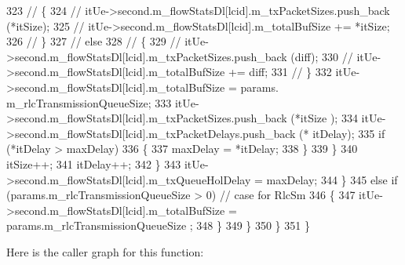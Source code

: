 \begin{DoxyCode}
323 \textcolor{comment}{//                                      \{}
324 \textcolor{comment}{//                                              itUe->second.m\_flowStatsDl[lcid].m\_txPacketSizes.push\_back
       (*itSize);}
325 \textcolor{comment}{//                                              itUe->second.m\_flowStatsDl[lcid].m\_totalBufSize += *itSize;}
326 \textcolor{comment}{//                                      \}}
327 \textcolor{comment}{//                                      else}
328 \textcolor{comment}{//                                      \{}
329 \textcolor{comment}{//                                              itUe->second.m\_flowStatsDl[lcid].m\_txPacketSizes.push\_back
       (diff);}
330 \textcolor{comment}{//                                              itUe->second.m\_flowStatsDl[lcid].m\_totalBufSize += diff;}
331 \textcolor{comment}{//                                      \}}
332                                         itUe->second.m\_flowStatsDl[lcid].m\_totalBufSize = params.
      m\_rlcTransmissionQueueSize;
333                                         itUe->second.m\_flowStatsDl[lcid].m\_txPacketSizes.push\_back (*itSize
      );
334                                         itUe->second.m\_flowStatsDl[lcid].m\_txPacketDelays.push\_back (*
      itDelay);
335                                         \textcolor{keywordflow}{if} (*itDelay > maxDelay)
336                                         \{
337                                                 maxDelay = *itDelay;
338                                         \}
339                                 \}
340                                 itSize++;
341                                 itDelay++;
342                         \}
343                         itUe->second.m\_flowStatsDl[lcid].m\_txQueueHolDelay = maxDelay;
344                 \}
345                 \textcolor{keywordflow}{else} \textcolor{keywordflow}{if} (params.m\_rlcTransmissionQueueSize > 0)  \textcolor{comment}{// case for RlcSm}
346                 \{
347                         itUe->second.m\_flowStatsDl[lcid].m\_totalBufSize = params.m\_rlcTransmissionQueueSize
      ;
348                 \}
349         \}
350   \}
351 \}
\end{DoxyCode}


Here is the caller graph for this function\+:


